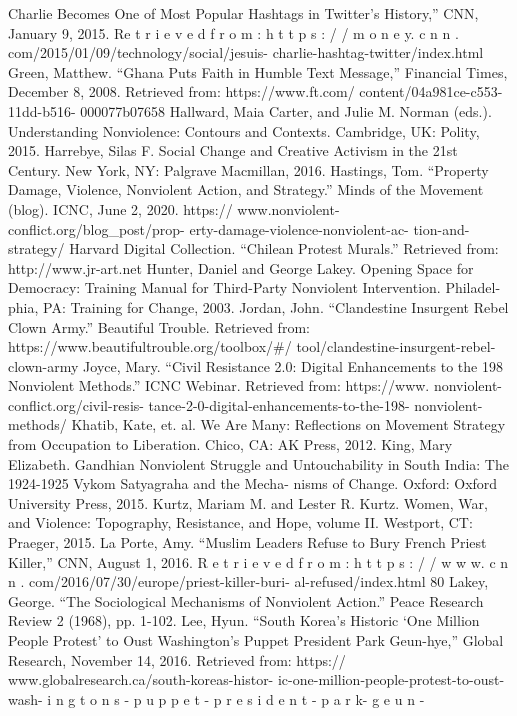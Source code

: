 \documentclass[twoside,a4paper,12pt,fleqn,openany]{extbook}
\begin{document}
Charlie Becomes One of Most Popular Hashtags
in Twitter’s History,” CNN, January 9, 2015.
Re t r i e v e d f r o m : h t t p s : / / m o n e y. c n n .
com/2015/01/09/technology/social/jesuis-
charlie-hashtag-twitter/index.html
Green, Matthew. “Ghana Puts Faith in Humble
Text Message,” Financial Times, December 8,
2008. Retrieved from: https://www.ft.com/
content/04a981ce-c553-11dd-b516-
000077b07658
Hallward, Maia Carter, and Julie M. Norman
(eds.). Understanding Nonviolence: Contours
and Contexts. Cambridge, UK: Polity, 2015.
Harrebye, Silas F. Social Change and Creative
Activism in the 21st Century. New York, NY:
Palgrave Macmillan, 2016.
Hastings, Tom. “Property Damage, Violence,
Nonviolent Action, and Strategy.” Minds of the
Movement (blog). ICNC, June 2, 2020. https://
www.nonviolent-conflict.org/blog_post/prop-
erty-damage-violence-nonviolent-ac-
tion-and-strategy/
Harvard Digital Collection. “Chilean Protest
Murals.” Retrieved from: http://www.jr-art.net
Hunter, Daniel and George Lakey. Opening
Space for Democracy: Training Manual for
Third-Party Nonviolent Intervention. Philadel-
phia, PA: Training for Change, 2003.
Jordan, John. “Clandestine Insurgent Rebel
Clown Army.” Beautiful Trouble. Retrieved from:
https://www.beautifultrouble.org/toolbox/#/
tool/clandestine-insurgent-rebel-clown-army
Joyce, Mary. “Civil Resistance 2.0: Digital
Enhancements to the 198 Nonviolent Methods.”
ICNC Webinar. Retrieved from: https://www.
nonviolent-conflict.org/civil-resis-
tance-2-0-digital-enhancements-to-the-198-
nonviolent-methods/
Khatib, Kate, et. al. We Are Many: Reflections
on Movement Strategy from Occupation to
Liberation. Chico, CA: AK Press, 2012.
King, Mary Elizabeth. Gandhian Nonviolent
Struggle and Untouchability in South India: The
1924-1925 Vykom Satyagraha and the Mecha-
nisms of Change. Oxford: Oxford University
Press, 2015.
Kurtz, Mariam M. and Lester R. Kurtz. Women,
War, and Violence: Topography, Resistance, and
Hope, volume II. Westport, CT: Praeger, 2015.
La Porte, Amy. “Muslim Leaders Refuse to Bury
French Priest Killer,” CNN, August 1, 2016.
R e t r i e v e d f r o m : h t t p s : / / w w w. c n n .
com/2016/07/30/europe/priest-killer-buri-
al-refused/index.html
80
Lakey, George. “The Sociological Mechanisms
of Nonviolent Action.” Peace Research Review
2 (1968), pp. 1-102.
Lee, Hyun. “South Korea’s Historic ‘One Million
People Protest’ to Oust Washington’s Puppet
President Park Geun-hye,” Global Research,
November 14, 2016. Retrieved from: https://
www.globalresearch.ca/south-koreas-histor-
ic-one-million-people-protest-to-oust-wash-
i n g t o n s - p u p p e t - p r e s i d e n t - p a r k- g e u n -
\end{document}
